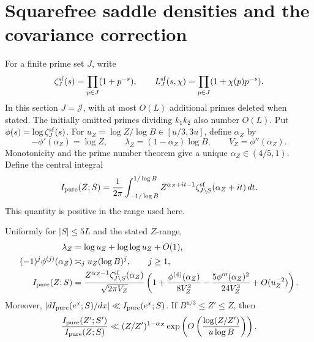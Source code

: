 \section{Squarefree saddle densities and the covariance correction}
\label{sec:saddle}

For a finite prime set \(J\), write
\[
 \zeta_J^{\rm sf}(s)=\prod_{p\in J}(1+p^{-s}),\qquad
 L_J^{\rm sf}(s,\chi)=\prod_{p\in J}(1+\chi(p)p^{-s}).
\]
In this section \(J=\mathcal J\), with at most \(O(L)\) additional
primes deleted when stated.  The initially omitted primes dividing
\(k_1k_2\) also number \(O(L)\).  Put
\(\phi(s)=\log\zeta_J^{\rm sf}(s)\).  For
\(u_Z=\log Z/\log B\in[u/3,3u]\), define \(\alpha_Z\) by
\[
 -\phi'(\alpha_Z)=\log Z,
 \qquad \lambda_Z=(1-\alpha_Z)\log B,
 \qquad V_Z=\phi''(\alpha_Z).
\]
Monotonicity and the prime number theorem give a unique
\(\alpha_Z\in(4/5,1)\).  Define the central integral
\begin{equation}\label{eq:pure}
 I_{\rm pure}(Z;S)=\frac1{2\pi}
 \int_{-1/\log B}^{1/\log B}
       Z^{\alpha_Z+it-1}\zeta_{J\setminus S}^{\rm sf}(\alpha_Z+it)\,dt.
\end{equation}
This quantity is positive in the range used here.

\begin{lemma}\label{lem:saddle}
Uniformly for \(|S|\le5L\) and the stated \(Z\)-range,
\begin{align}
 \lambda_Z&=\log u_Z+\log\log u_Z+O(1),\label{eq:lambda}\\
 (-1)^j\phi^{(j)}(\alpha_Z)&\asymp_j u_Z(\log B)^j,
               \qquad j\ge1,\label{eq:cumulants}\\
 I_{\rm pure}(Z;S)
 &=\frac{Z^{\alpha_Z-1}\zeta_{J\setminus S}^{\rm sf}(\alpha_Z)}
          {\sqrt{2\pi V_Z}}
       \left(1+\frac{\phi^{(4)}(\alpha_Z)}{8V_Z^2}
                -\frac{5\phi'''(\alpha_Z)^2}{24V_Z^3}
                +O(u_Z^{-2})\right).\label{eq:edgeworth}
\end{align}
Moreover,
\(\left|dI_{\rm pure}(e^x;S)/dx\right|\ll I_{\rm pure}(e^x;S)\).
If \(B^{u/3}\le Z'\le Z\), then
\begin{equation}\label{eq:saddle-ratio}
 \frac{I_{\rm pure}(Z';S')}{I_{\rm pure}(Z;S)}
 \ll (Z/Z')^{1-\alpha_Z}
       \exp\left(O\left(\frac{\log(Z/Z')}{u\log B}\right)\right).
\end{equation}
\end{lemma}

